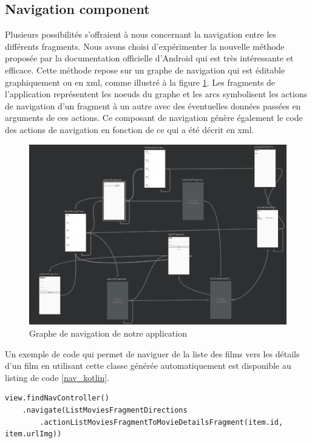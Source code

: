 \subsection{Navigation component}
Plusieurs possibilités s'offraient à nous concernant la navigation entre les différents fragments. Nous avons choisi d'expérimenter la nouvelle méthode proposée par la documentation officielle d'Android \cite{docandroid} qui est très intéressante et efficace.
Cette méthode repose sur un graphe de navigation qui est éditable graphiquement ou en \acrshort{xml}, comme illustré à la figure \ref{nav_graph}. Les fragments de l'application représentent les noeuds du graphe et les arcs symbolisent les actions de navigation d'un fragment à un autre avec des éventuelles données passées en arguments de ces actions. Ce composant de navigation génère également le code des actions de navigation en fonction de ce qui a été décrit en \acrshort{xml}.
\begin{figure}
    \begin{center}
        \includegraphics[width=1\textwidth]{img/screenshots/nav_graph.png}
    \end{center}
    \caption{Graphe de navigation de notre application}
    \label{nav_graph}
\end{figure}

Un exemple de code qui permet de naviguer de la liste des films vers les détails d'un film en utilisant cette classe générée automatiquement est disponible au listing de code \ref{nav_kotlin}.
\bigbreak
\begin{code}
    \begin{verbatim}
view.findNavController()
    .navigate(ListMoviesFragmentDirections
        .actionListMoviesFragmentToMovieDetailsFragment(item.id, item.urlImg))
    \end{verbatim}
    \caption{Exemple de navigation}
    \label{nav_kotlin}
\end{code}
\bigbreak


